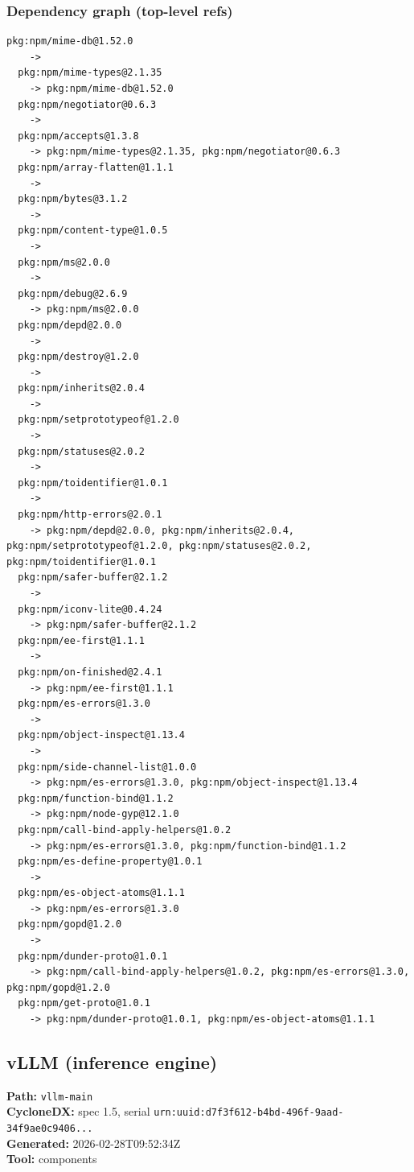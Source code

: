 \documentclass[11pt,a4paper]{article}
\begin{document}
\subsubsection*{Dependency graph (top-level refs)}
\begin{lstlisting}[style=depgraph]
  pkg:npm/mime-db@1.52.0
    -> 
  pkg:npm/mime-types@2.1.35
    -> pkg:npm/mime-db@1.52.0
  pkg:npm/negotiator@0.6.3
    -> 
  pkg:npm/accepts@1.3.8
    -> pkg:npm/mime-types@2.1.35, pkg:npm/negotiator@0.6.3
  pkg:npm/array-flatten@1.1.1
    -> 
  pkg:npm/bytes@3.1.2
    -> 
  pkg:npm/content-type@1.0.5
    -> 
  pkg:npm/ms@2.0.0
    -> 
  pkg:npm/debug@2.6.9
    -> pkg:npm/ms@2.0.0
  pkg:npm/depd@2.0.0
    -> 
  pkg:npm/destroy@1.2.0
    -> 
  pkg:npm/inherits@2.0.4
    -> 
  pkg:npm/setprototypeof@1.2.0
    -> 
  pkg:npm/statuses@2.0.2
    -> 
  pkg:npm/toidentifier@1.0.1
    -> 
  pkg:npm/http-errors@2.0.1
    -> pkg:npm/depd@2.0.0, pkg:npm/inherits@2.0.4, pkg:npm/setprototypeof@1.2.0, pkg:npm/statuses@2.0.2, pkg:npm/toidentifier@1.0.1
  pkg:npm/safer-buffer@2.1.2
    -> 
  pkg:npm/iconv-lite@0.4.24
    -> pkg:npm/safer-buffer@2.1.2
  pkg:npm/ee-first@1.1.1
    -> 
  pkg:npm/on-finished@2.4.1
    -> pkg:npm/ee-first@1.1.1
  pkg:npm/es-errors@1.3.0
    -> 
  pkg:npm/object-inspect@1.13.4
    -> 
  pkg:npm/side-channel-list@1.0.0
    -> pkg:npm/es-errors@1.3.0, pkg:npm/object-inspect@1.13.4
  pkg:npm/function-bind@1.1.2
    -> pkg:npm/node-gyp@12.1.0
  pkg:npm/call-bind-apply-helpers@1.0.2
    -> pkg:npm/es-errors@1.3.0, pkg:npm/function-bind@1.1.2
  pkg:npm/es-define-property@1.0.1
    -> 
  pkg:npm/es-object-atoms@1.1.1
    -> pkg:npm/es-errors@1.3.0
  pkg:npm/gopd@1.2.0
    -> 
  pkg:npm/dunder-proto@1.0.1
    -> pkg:npm/call-bind-apply-helpers@1.0.2, pkg:npm/es-errors@1.3.0, pkg:npm/gopd@1.2.0
  pkg:npm/get-proto@1.0.1
    -> pkg:npm/dunder-proto@1.0.1, pkg:npm/es-object-atoms@1.1.1
\end{lstlisting}

\subsection{vLLM (inference engine)}
\textbf{Path:} \texttt{vllm-main}
\\ \textbf{CycloneDX:} spec 1.5, serial \texttt{urn:uuid:d7f3f612-b4bd-496f-9aad-34f9ae0c9406...}
\\ \textbf{Generated:} 2026-02-28T09:52:34Z
\\ \textbf{Tool:} components
\end{document}
